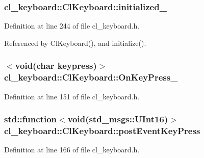 \subsubsection[{\texorpdfstring{initialized\+\_\+}{initialized_}}]{ cl\+\_\+keyboard\+::\+Cl\+Keyboard\+::initialized\+\_\+\hspace{0.3cm}{\ttfamily [private]}}\hypertarget{classcl__keyboard_1_1ClKeyboard_a96128ed5180e0dc5cfe76c90a9f8e8f7}{}\label{classcl__keyboard_1_1ClKeyboard_a96128ed5180e0dc5cfe76c90a9f8e8f7}


Definition at line 244 of file cl\+\_\+keyboard.\+h.



Referenced by Cl\+Keyboard(), and initialize().

\subsubsection[{\texorpdfstring{On\+Key\+Press\+\_\+}{OnKeyPress_}}]{$<$void(char keypress)$>$ cl\+\_\+keyboard\+::\+Cl\+Keyboard\+::\+On\+Key\+Press\+\_\+}\hypertarget{classcl__keyboard_1_1ClKeyboard_ae7fb61a86ed9cdd313f0cc1b2661c63c}{}\label{classcl__keyboard_1_1ClKeyboard_ae7fb61a86ed9cdd313f0cc1b2661c63c}


Definition at line 151 of file cl\+\_\+keyboard.\+h.

\subsubsection[{\texorpdfstring{post\+Event\+Key\+Press}{postEventKeyPress}}]{\setlength{\rightskip}{0pt plus 5cm}std\+::function$<$void(std\+\_\+msgs\+::\+U\+Int16)$>$ cl\+\_\+keyboard\+::\+Cl\+Keyboard\+::post\+Event\+Key\+Press}\hypertarget{classcl__keyboard_1_1ClKeyboard_ae9811fd50207ba9b69a4f27e7f8b4e86}{}\label{classcl__keyboard_1_1ClKeyboard_ae9811fd50207ba9b69a4f27e7f8b4e86}


Definition at line 166 of file cl\+\_\+keyboard.\+h.



